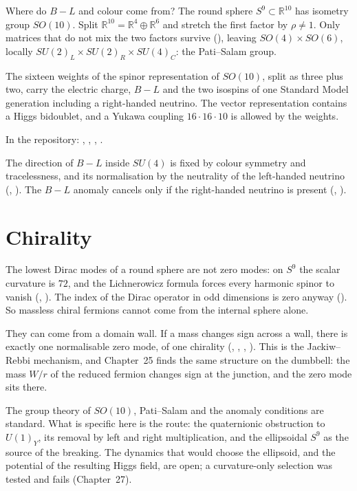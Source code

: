Where do $B-L$ and colour come from? The round sphere $S^9\subset\mathbb R^{10}$ has isometry group $SO(10)$. Split $\mathbb R^{10}=\mathbb R^4\oplus\mathbb R^6$ and stretch the first factor by $\rho\ne1$. Only matrices that do not mix the two factors survive (), leaving $SO(4)\times SO(6)$, locally $SU(2)_L\times SU(2)_R\times SU(4)_C$: the Pati--Salam group.

\begin{theorem}\proved
The sixteen weights of the spinor representation of $SO(10)$, split as three plus two, carry the electric charge, $B-L$ and the two isospins of one Standard Model generation including a right-handed neutrino. The vector representation contains a Higgs bidoublet, and a Yukawa coupling $16\cdot16\cdot10$ is allowed by the weights.
\end{theorem}
\noindent In the repository: , , , .

The direction of $B-L$ inside $SU(4)$ is fixed by colour symmetry and tracelessness, and its normalisation by the neutrality of the left-handed neutrino (, ). The $B-L$ anomaly cancels only if the right-handed neutrino is present (, ).

\section{Chirality}

The lowest Dirac modes of a round sphere are not zero modes: on $S^9$ the scalar curvature is $72$, and the Lichnerowicz formula forces every harmonic spinor to vanish (, ). The index of the Dirac operator in odd dimensions is zero anyway (). So massless chiral fermions cannot come from the internal sphere alone. \negative

They can come from a domain wall. If a mass changes sign across a wall, there is exactly one normalisable zero mode, of one chirality (, , , ). This is the Jackiw--Rebbi mechanism, and Chapter~25 finds the same structure on the dumbbell: the mass $W/r$ of the reduced fermion changes sign at the junction, and the zero mode sits there.

\begin{standsbox}
The group theory of $SO(10)$, Pati--Salam and the anomaly conditions are standard. What is specific here is the route: the quaternionic obstruction to $U(1)_Y$, its removal by left and right multiplication, and the ellipsoidal $S^9$ as the source of the breaking. The dynamics that would choose the ellipsoid, and the potential of the resulting Higgs field, are open; a curvature-only selection was tested and fails (Chapter~27). \open
\end{standsbox}

